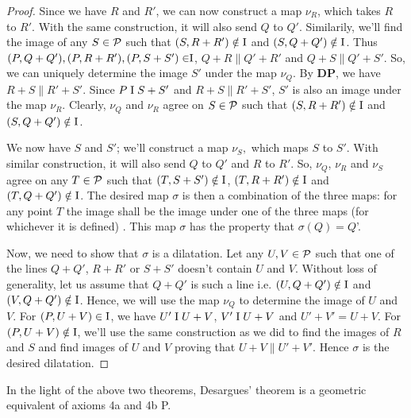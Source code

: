 \begin{proof}
    Since we have $R$ and $R'$, we can now construct a map $\nu_R$, which takes $R$ to $R'$. With the same construction, it will also send $Q$ to $Q'$. Similarily, we'll find the image of any $S \in \mathcal{P}$ such that $(S, R+R') \notin \text{I}$ and $(S, Q+Q') \notin \text{I}$. Thus $(P, Q+Q'), (P,R+R'), (P,S+S') \in \mathrel\text{I}$, $Q+R \parallel Q'+R'$ and $Q+S \parallel Q'+S'$. So, we can uniquely determine the image $S'$ under the map $\nu_Q$. By $\mathbf{DP}$, we have $R+S \parallel  R'+S'$. Since $P\mathrel\text{I} S+S'$ and $R+S \parallel R'+S'$, $S'$ is also an image under the map $\nu_R$. Clearly, $\nu_Q$ and $\nu_R$ agree on $S \in \mathcal{P}$ such that $(S, R+R') \notin \text{I}$ and $(S, Q+Q') \notin \text{I}$.

    We now have $S$ and $S'$; we'll construct a map $\nu_S,$ which maps $S$ to $S'$. With similar construction, it will also send $Q$ to $Q'$ and $R$ to $R'$. So, $\nu_Q$, $\nu_R$ and $\nu_S$ agree on any $T \in \mathcal{P}$ such that $(T, S+S') \notin \text{I}$, $(T, R+R') \notin \text{I}$ and $(T, Q+Q') \notin \text{I}$. The desired map $\sigma$ is then a combination of the three maps: for any point $T$ the image shall be the image under one of the three maps (for whichever it is defined) . This map $\sigma$ has the property that $\sigma(Q) = Q$'.
    
    Now, we need to show that $\sigma$ is a dilatation.  Let any $U,V \in \mathcal{P}$ such that one of the lines $Q+Q'$, $R+R'$ or $S+S'$ doesn't contain $U$ and $V$. Without loss of generality, let us assume that $Q+Q'$ is such a line i.e. $(U,Q+Q') \notin \text{I}$ and $(V, Q+Q') \notin \text{I}$. Hence, we will use the map $\nu_Q$ to determine the image of $U$ and $V$. For $(P, U+V) \in \text{I}$, we have $U'\mathrel\text{I} U+V$, $V' \mathrel\text{I} U+V$ and $U'+V'=U+V$. For $(P, U+V) \notin \text{I}$, we'll use the same construction as we did to find the images of $R$ and $S$ and find images of $U$ and $V$ proving that $U+V \parallel U'+V'$. Hence $\sigma$ is the desired dilatation.
\end{proof}

In the light of the above two theorems, Desargues' theorem is a geometric equivalent of axioms 4a and 4b P.
